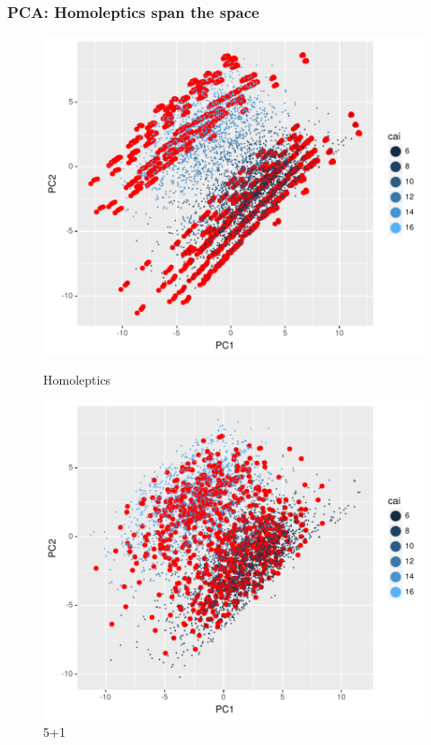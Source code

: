 \documentclass[xcolor=dvipsnames]{beamer}
\begin{document}
\begin{frame}
\frametitle{PCA: Homoleptics span the space}
\begin{figure}[ht] 
	\begin{minipage}[b]{0.5\linewidth}
		\centering
		\includegraphics[width=.5\linewidth]{img/pca_rf39_HomoIntoSU_cai_span.pdf} 
		\caption{Homoleptics} 
	\end{minipage}%
	\begin{minipage}[b]{0.5\linewidth}
		\centering
		\includegraphics[width=.5\linewidth]{img/pca_rf39_FoIntoSU_cai_span.pdf} 
		\caption{5+1}
	\end{minipage} 
	

\end{figure}
\end{frame}
\end{document}
